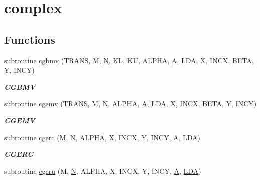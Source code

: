 \hypertarget{group__complex__blas__level2}{}\section{complex}
\label{group__complex__blas__level2}
\subsection*{Functions}
\begin{DoxyCompactItemize}
\item 
subroutine \hyperlink{group__complex__blas__level2_ga50fe7a70e7ae8f9ede50acd6747510d7}{cgbmv} (\hyperlink{superlu__enum__consts_8h_a0c4e17b2d5cea33f9991ccc6a6678d62a1f61e3015bfe0f0c2c3fda4c5a0cdf58}{T\+R\+A\+N\+S}, M, \hyperlink{polmisc_8c_a0240ac851181b84ac374872dc5434ee4}{N}, K\+L, K\+U, A\+L\+P\+H\+A, \hyperlink{classA}{A}, \hyperlink{example__user_8c_ae946da542ce0db94dced19b2ecefd1aa}{L\+D\+A}, X, I\+N\+C\+X, B\+E\+T\+A, Y, I\+N\+C\+Y)
\begin{DoxyCompactList}\small\item\em {\bfseries C\+G\+B\+M\+V} \end{DoxyCompactList}\item 
subroutine \hyperlink{group__complex__blas__level2_ga0983da08821bec7701e90fb1e65c8cd7}{cgemv} (\hyperlink{superlu__enum__consts_8h_a0c4e17b2d5cea33f9991ccc6a6678d62a1f61e3015bfe0f0c2c3fda4c5a0cdf58}{T\+R\+A\+N\+S}, M, \hyperlink{polmisc_8c_a0240ac851181b84ac374872dc5434ee4}{N}, A\+L\+P\+H\+A, \hyperlink{classA}{A}, \hyperlink{example__user_8c_ae946da542ce0db94dced19b2ecefd1aa}{L\+D\+A}, X, I\+N\+C\+X, B\+E\+T\+A, Y, I\+N\+C\+Y)
\begin{DoxyCompactList}\small\item\em {\bfseries C\+G\+E\+M\+V} \end{DoxyCompactList}\item 
subroutine \hyperlink{group__complex__blas__level2_ga35e2f0f20e014b9f0ec090a6eb3def22}{cgerc} (M, \hyperlink{polmisc_8c_a0240ac851181b84ac374872dc5434ee4}{N}, A\+L\+P\+H\+A, X, I\+N\+C\+X, Y, I\+N\+C\+Y, \hyperlink{classA}{A}, \hyperlink{example__user_8c_ae946da542ce0db94dced19b2ecefd1aa}{L\+D\+A})
\begin{DoxyCompactList}\small\item\em {\bfseries C\+G\+E\+R\+C} \end{DoxyCompactList}\item 
subroutine \hyperlink{group__complex__blas__level2_gab21c402efadfa2023cfbc06911506e42}{cgeru} (M, \hyperlink{polmisc_8c_a0240ac851181b84ac374872dc5434ee4}{N}, A\+L\+P\+H\+A, X, I\+N\+C\+X, Y, I\+N\+C\+Y, \hyperlink{classA}{A}, \hyperlink{example__user_8c_ae946da542ce0db94dced19b2ecefd1aa}{L\+D\+A})

\end{DoxyCompactItemize}
